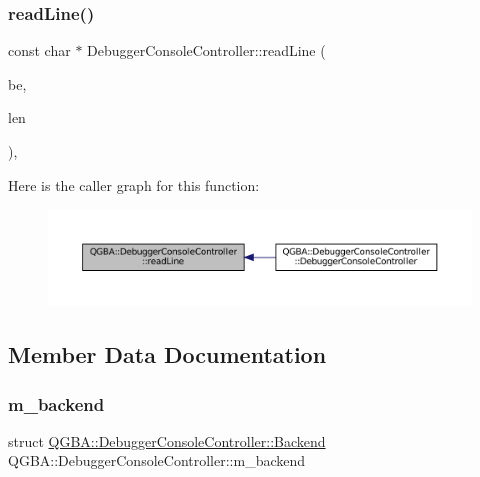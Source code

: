 \subsubsection{\texorpdfstring{read\+Line()}{readLine()}}
{\footnotesize\ttfamily const char $\ast$ Debugger\+Console\+Controller\+::read\+Line (\begin{DoxyParamCaption}\item[{struct C\+L\+I\+Debugger\+Backend $\ast$}]{be,  }\item[{size\+\_\+t $\ast$}]{len }\end{DoxyParamCaption})\hspace{0.3cm}{\ttfamily [static]}, {\ttfamily [private]}}

Here is the caller graph for this function\+:
\nopagebreak
\begin{figure}[H]
\begin{center}
\leavevmode
\includegraphics[width=350pt]{class_q_g_b_a_1_1_debugger_console_controller_a67c80cd51a818693fe1d8d27bcadbcce_icgraph}
\end{center}
\end{figure}


\subsection{Member Data Documentation}
\mbox{\label{class_q_g_b_a_1_1_debugger_console_controller_a88fed59f1d11fabe9270e808c75a1561}} 
\subsubsection{\texorpdfstring{m\+\_\+backend}{m\_backend}}
{\footnotesize\ttfamily struct \mbox{\hyperlink{class_q_g_b_a_1_1_debugger_console_controller_struct_q_g_b_a_1_1_debugger_console_controller_1_1_backend}{Q\+G\+B\+A\+::\+Debugger\+Console\+Controller\+::\+Backend}}  Q\+G\+B\+A\+::\+Debugger\+Console\+Controller\+::m\+\_\+backend\hspace{0.3cm}{\ttfamily [private]}}


